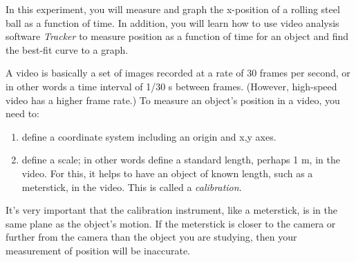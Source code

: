 

\apparatus


\longgoal

In this experiment, you will measure and graph the x-position of a rolling steel ball as a function of time. In addition, you will learn how to use video analysis software \emph{Tracker} to measure position as a function of time for an object and find the best-fit curve to a graph.

\introduction

A video is basically a set of images recorded at a rate of 30 frames per second, or in other words a time interval of 1/30 s between frames. (However, high-speed video has a higher frame rate.) To measure an object's position in a video, you need to:

\begin{enumerate}
	\item define a coordinate system including an origin and x,y axes.
	\item define a scale; in other words define a standard length, perhaps 1 m, in the video. For this, it helps to have an object of known length, such as a meterstick, in the video. This is called a \emph{calibration}.
\end{enumerate}

	
	It's very important that the calibration instrument, like a meterstick, is in the same plane as the object's motion. If the meterstick is closer to the camera or further from the camera than the object you are studying, then your measurement of position will be inaccurate.


